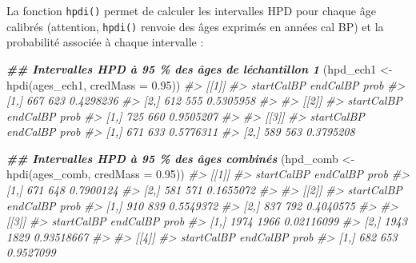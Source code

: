 \documentclass[
  french,
]{scrbook}
\newenvironment{Shaded}{\begin{snugshade}}{\end{snugshade}}
\newcommand{\AttributeTok}[1]{\textcolor[rgb]{0.77,0.63,0.00}{#1}}
\newcommand{\CommentTok}[1]{\textcolor[rgb]{0.56,0.35,0.01}{\textit{#1}}}
\newcommand{\DocumentationTok}[1]{\textcolor[rgb]{0.56,0.35,0.01}{\textbf{\textit{#1}}}}
\newcommand{\FloatTok}[1]{\textcolor[rgb]{0.00,0.00,0.81}{#1}}
\newcommand{\FunctionTok}[1]{\textcolor[rgb]{0.00,0.00,0.00}{#1}}
\newcommand{\NormalTok}[1]{#1}
\newcommand{\OtherTok}[1]{\textcolor[rgb]{0.56,0.35,0.01}{#1}}
\begin{document}
La fonction \texttt{hpdi()} permet de calculer les intervalles HPD pour chaque âge calibrés (attention, \texttt{hpdi()} renvoie des âges exprimés en années cal BP) et la probabilité associée à chaque intervalle :

\begin{Shaded}
\begin{Highlighting}[]
\DocumentationTok{\#\# Intervalles HPD à 95 \% des âges de l\textquotesingle{}échantillon 1}
\NormalTok{(hpd\_ech1 }\OtherTok{\textless{}{-}} \FunctionTok{hpdi}\NormalTok{(ages\_ech1, }\AttributeTok{credMass =} \FloatTok{0.95}\NormalTok{))}
\CommentTok{\#\textgreater{} [[1]]}
\CommentTok{\#\textgreater{}      startCalBP endCalBP      prob}
\CommentTok{\#\textgreater{} [1,]        667      623 0.4298236}
\CommentTok{\#\textgreater{} [2,]        612      555 0.5305958}
\CommentTok{\#\textgreater{} }
\CommentTok{\#\textgreater{} [[2]]}
\CommentTok{\#\textgreater{}      startCalBP endCalBP      prob}
\CommentTok{\#\textgreater{} [1,]        725      660 0.9505207}
\CommentTok{\#\textgreater{} }
\CommentTok{\#\textgreater{} [[3]]}
\CommentTok{\#\textgreater{}      startCalBP endCalBP      prob}
\CommentTok{\#\textgreater{} [1,]        671      633 0.5776311}
\CommentTok{\#\textgreater{} [2,]        589      563 0.3795208}

\DocumentationTok{\#\# Intervalles HPD à 95 \% des âges combinés}
\NormalTok{(hpd\_comb }\OtherTok{\textless{}{-}} \FunctionTok{hpdi}\NormalTok{(ages\_comb, }\AttributeTok{credMass =} \FloatTok{0.95}\NormalTok{))}
\CommentTok{\#\textgreater{} [[1]]}
\CommentTok{\#\textgreater{}      startCalBP endCalBP      prob}
\CommentTok{\#\textgreater{} [1,]        671      648 0.7900124}
\CommentTok{\#\textgreater{} [2,]        581      571 0.1655072}
\CommentTok{\#\textgreater{} }
\CommentTok{\#\textgreater{} [[2]]}
\CommentTok{\#\textgreater{}      startCalBP endCalBP      prob}
\CommentTok{\#\textgreater{} [1,]        910      839 0.5549372}
\CommentTok{\#\textgreater{} [2,]        837      792 0.4040575}
\CommentTok{\#\textgreater{} }
\CommentTok{\#\textgreater{} [[3]]}
\CommentTok{\#\textgreater{}      startCalBP endCalBP       prob}
\CommentTok{\#\textgreater{} [1,]       1974     1966 0.02116099}
\CommentTok{\#\textgreater{} [2,]       1943     1829 0.93518667}
\CommentTok{\#\textgreater{} }
\CommentTok{\#\textgreater{} [[4]]}
\CommentTok{\#\textgreater{}      startCalBP endCalBP      prob}
\CommentTok{\#\textgreater{} [1,]        682      653 0.9527099}
\end{Highlighting}
\end{Shaded}
\end{document}
